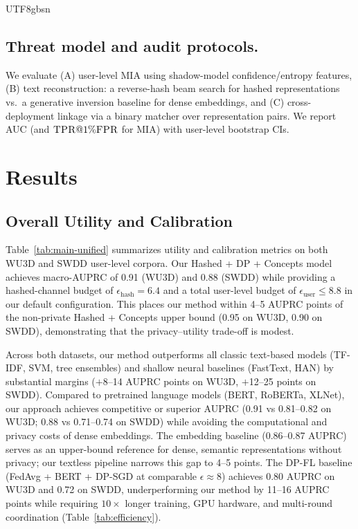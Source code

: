 \documentclass[lettersize,journal]{IEEEtran}
\begin{document}
\begin{CJK*}{UTF8}{gbsn}
\subsection{Threat model and audit protocols.}
We evaluate (A) user-level \textsc{MIA} using shadow-model confidence/entropy features, (B) text reconstruction: a reverse-hash beam search for hashed representations vs.\ a generative inversion baseline for dense embeddings, and (C) cross-deployment linkage via a binary matcher over representation pairs. We report \textsc{AUC} (and $\textsc{TPR}@1\%\textsc{FPR}$ for \textsc{MIA}) with user-level bootstrap CIs.

\section{Results}
\label{sec:results}
\subsection{Overall Utility and Calibration}
\label{sec:results:utility}

Table~\ref{tab:main-unified} summarizes utility and calibration metrics on both WU3D and SWDD user-level corpora. Our Hashed + DP + Concepts model achieves macro-AUPRC of 0.91 (WU3D) and 0.88 (SWDD) while providing a hashed-channel budget of $\epsilon_{\text{hash}}{=}6.4$ and a total user-level budget of $\epsilon_{\text{user}}{\le}8.8$ in our default configuration. This places our method within 4--5 AUPRC points of the non-private Hashed + Concepts upper bound (0.95 on WU3D, 0.90 on SWDD), demonstrating that the privacy--utility trade-off is modest.

Across both datasets, our method outperforms all classic text-based models (TF-IDF, SVM, tree ensembles) and shallow neural baselines (FastText, HAN) by substantial margins ($+$8--14 AUPRC points on WU3D, $+$12--25 points on SWDD). Compared to pretrained language models (BERT, RoBERTa, XLNet), our approach achieves competitive or superior AUPRC (0.91 vs 0.81--0.82 on WU3D; 0.88 vs 0.71--0.74 on SWDD) while avoiding the computational and privacy costs of dense embeddings. The embedding baseline (0.86--0.87 AUPRC) serves as an upper-bound reference for dense, semantic representations without privacy; our textless pipeline narrows this gap to 4--5 points.
The DP-FL baseline (FedAvg + BERT + DP-SGD at comparable $\epsilon{\approx}8$) achieves 0.80 AUPRC on WU3D and 0.72 on SWDD, underperforming our method by 11--16 AUPRC points while requiring $10{\times}$ longer training, GPU hardware, and multi-round coordination (Table~\ref{tab:efficiency}).


\end{CJK*}
\end{document}
